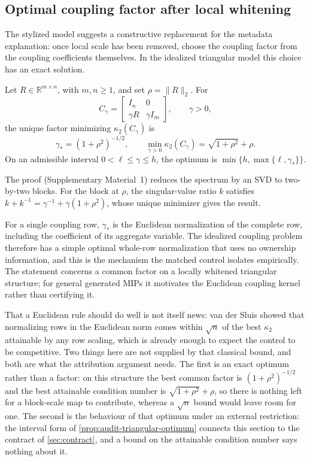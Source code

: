 \subsection{Optimal coupling factor after local whitening}

The stylized model suggests a constructive replacement for the metadata explanation: once
local scale has been removed, choose the coupling factor from the coupling coefficients
themselves. In the idealized triangular model this choice has an exact solution.

\begin{proposition}
\label{prop:audit-triangular-optimum}
Let $R\in\mathbb R^{m\times n}$, with $m,n\geq1$, and set $\rho=\|R\|_2$. For
\[
 C_\gamma=\begin{bmatrix}I_n&0\\\gamma R&\gamma I_m\end{bmatrix},
 \qquad\gamma>0,
\]
the unique factor minimizing $\kappa_2(C_\gamma)$ is
\[
 \gamma_*=(1+\rho^2)^{-1/2},
 \qquad
 \min_{\gamma>0}\kappa_2(C_\gamma)=\sqrt{1+\rho^2}+\rho.
\]
On an admissible interval $0<\ell\leq\gamma\leq h$, the optimum is
$\min\{h,\max\{\ell,\gamma_*\}\}$.
\end{proposition}
The proof (Supplementary Material~1) reduces the spectrum by an SVD to two-by-two blocks. For the
block at $\rho$, the singular-value ratio $k$ satisfies
$k+k^{-1}=\gamma^{-1}+\gamma(1+\rho^2)$, whose unique minimizer gives the result.

For a single coupling row, $\gamma_*$ is the Euclidean normalization of the complete row,
including the coefficient of its aggregate variable. The idealized coupling problem
therefore has a simple optimal whole-row normalization that uses no ownership information,
and this is the mechanism the matched control isolates empirically. The statement concerns a
common factor on a locally whitened triangular structure; for general generated MIPs it
motivates the Euclidean coupling kernel rather than certifying it.

That a Euclidean rule should do well is not itself news: van der Sluis
\cite{vandersluis1969condition} showed that normalizing rows in the Euclidean norm comes
within $\sqrt n$ of the best $\kappa_2$ attainable by any row scaling, which is already
enough to expect the control to be competitive. Two things here are not supplied by that
classical bound, and both are what the attribution argument needs. The first is an exact
optimum rather than a factor: on this structure the best common factor is $(1+\rho^2)^{-1/2}$
and the best attainable condition number is $\sqrt{1+\rho^2}+\rho$, so there is nothing left
for a block-scale map to contribute, whereas a $\sqrt n$ bound would leave room for one. The
second is the behaviour of that optimum under an external restriction: the interval form
of \cref{prop:audit-triangular-optimum} connects this section to the contract of \cref{sec:contract}, and a bound on
the attainable condition number says nothing about it.

